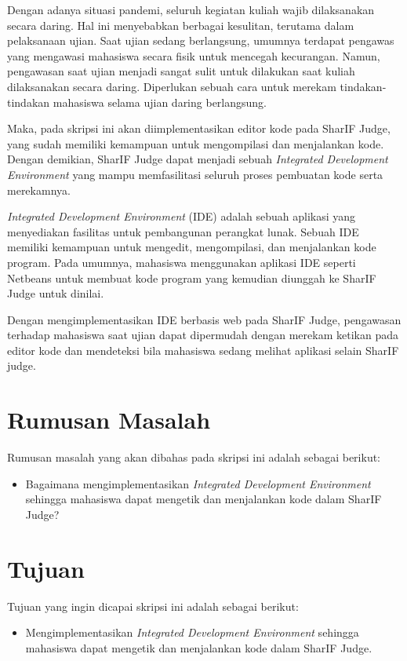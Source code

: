 \documentclass[a4paper,twoside]{article}
\begin{document}
Dengan adanya situasi pandemi, seluruh kegiatan kuliah wajib dilaksanakan secara daring. Hal ini menyebabkan berbagai kesulitan, terutama dalam pelaksanaan ujian. Saat ujian sedang berlangsung, umumnya terdapat pengawas yang mengawasi mahasiswa secara fisik untuk mencegah kecurangan. Namun, pengawasan saat ujian menjadi sangat sulit untuk dilakukan saat kuliah dilaksanakan secara daring. Diperlukan sebuah cara untuk merekam tindakan-tindakan mahasiswa selama ujian daring berlangsung. 

Maka, pada skripsi ini akan diimplementasikan editor kode pada SharIF Judge, yang sudah memiliki kemampuan untuk mengompilasi dan menjalankan kode. Dengan demikian, SharIF Judge dapat menjadi sebuah {\it Integrated Development Environment} yang mampu memfasilitasi seluruh proses pembuatan kode serta merekamnya.

{\it Integrated Development Environment} (IDE) adalah sebuah aplikasi yang menyediakan fasilitas untuk pembangunan perangkat lunak. Sebuah IDE memiliki kemampuan untuk mengedit, mengompilasi, dan menjalankan kode program. Pada umumnya, mahasiswa menggunakan aplikasi IDE seperti Netbeans untuk membuat kode program yang kemudian diunggah ke SharIF Judge untuk dinilai.

Dengan mengimplementasikan IDE berbasis web pada SharIF Judge, pengawasan terhadap mahasiswa saat ujian dapat dipermudah dengan merekam ketikan pada editor kode dan mendeteksi bila mahasiswa sedang melihat aplikasi selain SharIF judge.


\section{Rumusan Masalah}
\label{sec:rumusan}
Rumusan masalah yang akan dibahas pada skripsi ini adalah sebagai berikut:
\begin{itemize}
	\item Bagaimana mengimplementasikan {\it Integrated Development Environment} sehingga mahasiswa dapat mengetik dan menjalankan kode dalam SharIF Judge?
\end{itemize}

\section{Tujuan}
\label{sec:tujuan}
Tujuan yang ingin dicapai skripsi ini adalah sebagai berikut:
\begin{itemize}
	\item Mengimplementasikan {\it Integrated Development Environment} sehingga mahasiswa dapat mengetik dan menjalankan kode dalam SharIF Judge.
\end{itemize}
\end{document}
